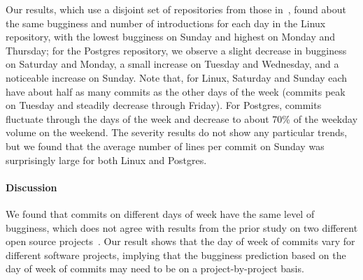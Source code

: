 Our results, which use a disjoint set of repositories from those
in~\cite{sliwerski-msr-2005}, found about the same bugginess and 
number of introductions for each
day in the Linux repository, with the lowest bugginess on Sunday and
highest on Monday and Thursday; for the Postgres repository, we
observe a slight decrease in bugginess on Saturday and Monday, a small
increase on Tuesday and Wednesday, and a noticeable increase on
Sunday.  Note that, for Linux, Saturday and Sunday each have about
half as many commits as the other days of the week (commits peak on
Tuesday and steadily decrease through Friday). For Postgres, commits
fluctuate through the days of the week and decrease to about 70\% of
the weekday volume on the weekend. The severity results do not show
any particular trends, but we found that the average number of lines
per commit on Sunday was surprisingly large for both Linux and Postgres.

\paragraph{Discussion}
We found that commits on different days of week have the same level of bugginess, which
does not agree with results from the prior study on two different open source projects~\cite{sliwerski-msr-2005}.  
Our result shows that the day of week of commits
vary for different software projects, implying that the bugginess prediction based on 
the day of week of commits may need to be on a project-by-project basis.


